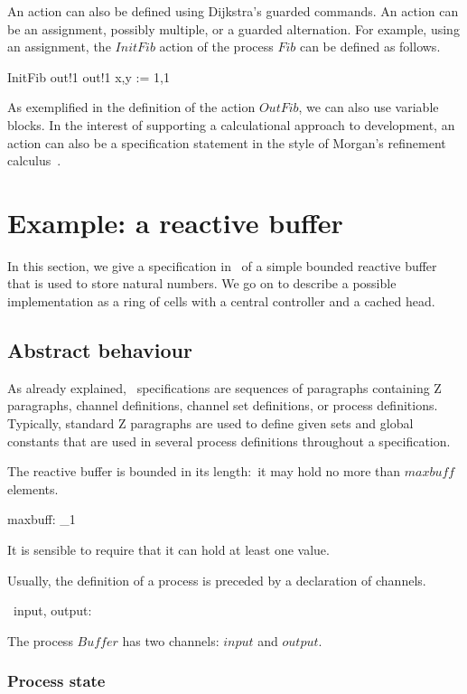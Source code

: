 \documentclass{article}
\begin{document}
An action can also be defined using Dijkstra's guarded commands.  An
action can be an assignment, possibly multiple, or a guarded
alternation.  For example, using an assignment, the $InitFib$ action
of the process $Fib$ can be defined as follows.
\begin{zed}
  InitFib  out!1 \then out!1 \then x,y := 1,1
\end{zed}
As exemplified in the definition of the action $OutFib$, we can also
use variable blocks.  In the interest of supporting a calculational
approach to development, an action can also be a specification
statement in the style of Morgan's refinement calculus~\cite{Mor94}.

\section{Example: a reactive buffer} \label{section:EARB}

In this section, we give a specification in \Circus\ of a simple
bounded reactive buffer that is used to store natural numbers.  We go
on to describe a possible implementation as a ring of cells with a
central controller and a cached head.

\subsection{Abstract behaviour}

As already explained, \Circus\ specifications are sequences of
paragraphs containing Z paragraphs, channel definitions, channel set
definitions, or process definitions.  Typically, standard Z paragraphs
are used to define given sets and global constants that are used in
several process definitions throughout a specification.

The reactive buffer is bounded in its length:~it may hold no more than
$maxbuff$ elements.
\begin{axdef}
  maxbuff: \nat_1
\end{axdef}
It is sensible to require that it can hold at least one value.

Usually, the definition of a process is preceded by a declaration of
channels.
\begin{zed}
  \circchannel\ input, output: \nat
\end{zed}
The process $Buffer$ has two channels: $input$ and $output
$.

\subsubsection{Process state}
\end{document}
